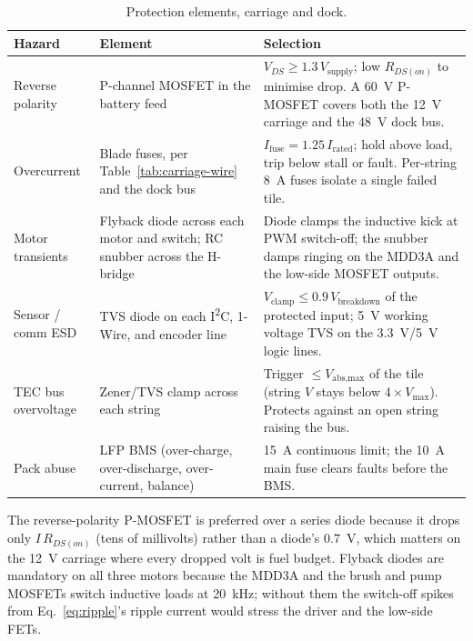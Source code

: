 \documentclass[11pt,a4paper]{article}
\begin{document}
\begin{table}[H]
\centering
\caption{Protection elements, carriage and dock.}
\label{tab:protection}
\small
\begin{tabular}{p{3.0cm} p{4.3cm} p{6.0cm}}
\toprule
Hazard & Element & Selection \\
\midrule
Reverse polarity & P-channel MOSFET in the battery feed
  & $V_{DS}\geq 1.3\,V_{\text{supply}}$; low $R_{DS(on)}$ to minimise drop. A
    \SI{60}{\volt} P-MOSFET covers both the \SI{12}{\volt} carriage and the
    \SI{48}{\volt} dock bus. \\
Overcurrent & Blade fuses, per Table~\ref{tab:carriage-wire} and the dock bus
  & $I_{\text{fuse}}=1.25\,I_{\text{rated}}$; hold above load, trip below stall
    or fault. Per-string \SI{8}{\ampere} fuses isolate a single failed tile. \\
Motor transients & Flyback diode across each motor and switch; RC snubber across
  the H-bridge & Diode clamps the inductive kick at PWM switch-off; the snubber
    damps ringing on the MDD3A and the low-side MOSFET outputs. \\
Sensor / comm ESD & TVS diode on each I\textsuperscript{2}C, 1-Wire, and encoder
  line & $V_{\text{clamp}}\leq\num{0.9}\,V_{\text{breakdown}}$ of the protected
    input; \SI{5}{\volt} working voltage TVS on the \SI{3.3}{\volt}/\SI{5}{\volt}
    logic lines. \\
TEC bus overvoltage & Zener/TVS clamp across each string
  & Trigger $\leq V_{\text{abs,max}}$ of the tile (string $V$ stays below
    $4\times V_{\max}$). Protects against an open string raising the bus. \\
Pack abuse & LFP BMS (over-charge, over-discharge, over-current, balance)
  & \SI{15}{\ampere} continuous limit; the \SI{10}{\ampere} main fuse clears
    faults before the BMS. \\
\bottomrule
\end{tabular}
\end{table}

The reverse-polarity P-MOSFET is preferred over a series diode because it drops
only $I\,R_{DS(on)}$ (tens of millivolts) rather than a diode's \SI{0.7}{\volt},
which matters on the \SI{12}{\volt} carriage where every dropped volt is fuel
budget. Flyback diodes are mandatory on all three motors because the MDD3A and
the brush and pump MOSFETs switch inductive loads at \SI{20}{\kilo\hertz};
without them the switch-off spikes from Eq.~\eqref{eq:ripple}'s ripple current
would stress the driver and the low-side FETs.
\end{document}
